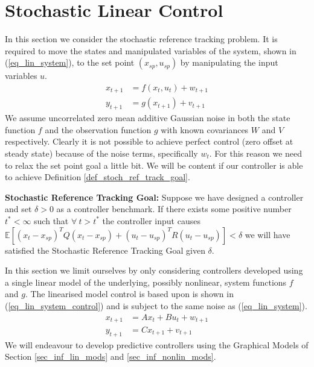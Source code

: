 \section{Stochastic Linear Control}
In this section we consider the stochastic reference tracking problem. It is required to move the states and manipulated variables of the system, shown in (\ref{eq_lin_system}), to the set point $(x_{sp}, u_{sp})$ by manipulating the input variables $u$.
\begin{equation}
\begin{aligned}
x_{t+1} &= f(x_t, u_t) + w_{t+1}  \\
y_{t+1} &= g(x_{t+1}) + v_{t+1}  
\end{aligned}
\label{eq_lin_system}
\end{equation}
We assume uncorrelated zero mean additive Gaussian noise in both the state function $f$ and the observation function $g$ with known covariances $W$ and $V$ respectively. Clearly it is not possible to achieve perfect control (zero offset at steady state) because of the noise terms, specifically $w_t$. For this reason we need to relax the set point goal a little bit. We will be content if our controller is able to achieve Definition \ref{def_stoch_ref_track_goal}.
\begin{defn}
\textbf{Stochastic Reference Tracking Goal:} Suppose we have designed a controller and set $\delta > 0$ as a controller benchmark. If there exists some positive number $t^* < \infty$ such that $\forall~t > t^*$ the controller input causes $\mathbb{E}[(x_t-x_{sp})^TQ(x_t-x_{sp}) + (u_t-u_{sp})^TR(u_t-u_{sp})] < \delta$ we will have satisfied the Stochastic Reference Tracking Goal given $\delta$.
\label{def_stoch_ref_track_goal}
\end{defn}
In this section we limit ourselves by only considering controllers developed using a single linear model of the underlying, possibly nonlinear, system functions $f$ and $g$. The linearised model control is based upon is shown in (\ref{eq_lin_system_control}) and is subject to the same noise as (\ref{eq_lin_system}).
\begin{equation}
\begin{aligned}
x_{t+1} &= Ax_t + Bu_t + w_{t+1}  \\
y_{t+1} &= Cx_{t+1} + v_{t+1}  
\end{aligned}
\label{eq_lin_system_control}
\end{equation}
We will endeavour to develop predictive controllers using the Graphical Models of Section \ref{sec_inf_lin_mods} and \ref{sec_inf_nonlin_mods}.

